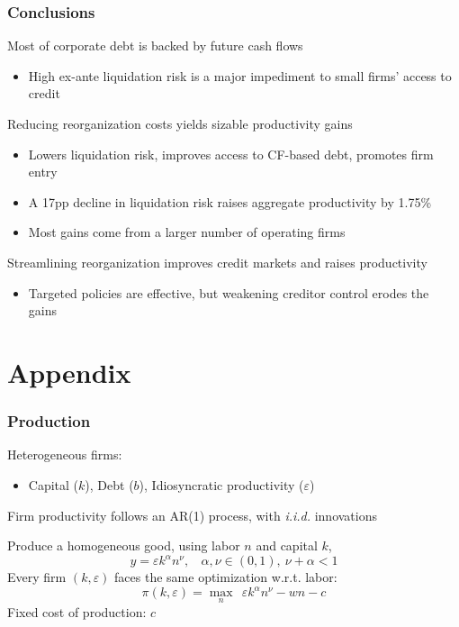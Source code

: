 \documentclass[aspectratio=169,xcolor=table]{beamer}
\begin{document}
\begin{frame}[label=3] \frametitle{Conclusions}

Most of corporate debt is backed by future cash flows
\begin{itemize} \small
    \item High ex-ante liquidation risk is a major impediment to small firms' access to credit
\end{itemize} \normalsize \vspace{3mm}


Reducing reorganization costs yields sizable productivity gains
\begin{itemize} \small
     \item Lowers liquidation risk, improves access to CF-based debt, promotes firm entry 
     \item A 17pp decline in liquidation risk raises aggregate productivity by 1.75\%
     \item Most gains come from a larger number of operating firms
\end{itemize} \normalsize \vspace{3mm}

Streamlining reorganization improves credit markets and raises productivity
\begin{itemize} \small
     \item Targeted policies are effective, but weakening creditor control erodes the gains
\end{itemize} \normalsize

\end{frame}


\appendix
\section{Appendix}



\begin{frame}[label=Firms] \frametitle{Production}

Heterogeneous firms: 
\begin{itemize} \small
    \item Capital ($k$), Debt ($b$), Idiosyncratic productivity ($\varepsilon$)
\end{itemize} 
Firm productivity follows an AR(1) process, with \textit{i.i.d.} innovations \normalsize \vspace{3mm}

Produce a homogeneous good, using labor $n$ and capital $k$,
$$ y = \varepsilon k^{\alpha}n^{\nu}, \ \ \ \ \alpha,\nu \in (0,1),  \ \nu + \alpha < 1 $$
Every firm $(k,\varepsilon)$ faces the same optimization w.r.t. labor:
$$ \pi(k,\varepsilon) = \max_{n} \ \  \varepsilon k^{\alpha}n^{\nu} - wn - c$$ 
Fixed cost of production: $c$

\end{frame}
\end{document}
